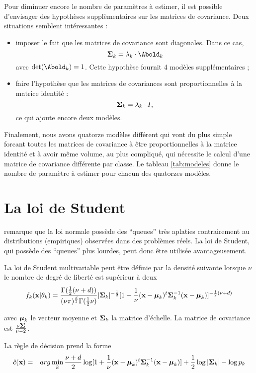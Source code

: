 Pour diminuer encore le nombre de param\`etres \`a estimer,
il est possible d'envisager des hypoth\`eses suppl\`ementaires
sur les matrices de covariance. Deux situations semblent
int\'eressantes :
\begin{itemize}
\item imposer le fait que les matrices de covariance sont diagonales. 
Dans ce cas, 
$$
\bSigma_k= \lambda_k \cdot \Abold_k
$$ 
avec  $\det(\Abold_k)=1$. Cette hypoth\`ese fournit 4 mod\`eles 
suppl\'ementaires ; 
\item faire l'hypoth\`ese que les matrices de covariances sont
proportionnelles \`a la matrice identit\'e :
$$
\mbox{\boldmath $\Sigma$}_k= \lambda_k \cdot I,
$$
ce qui ajoute encore deux mod\`eles.
\end{itemize}  


Finalement, nous avons quatorze mod\`eles diff\'erent qui vont
du plus simple forcant toutes les matrices de covariance \`a \^etre
proportionnelles \`a la matrice identit\'e et \`a avoir m\^eme volume,
au plus compliqu\'e, qui n\'ecessite le calcul d'une matrice de 
covariance diff\'erente par classe. Le tableau \ref{tab:modeles}
donne le nombre de param\`etre \`a estimer pour chacun des quatorzes
mod\`eles.



\section{La loi de Student}
 remarque que la loi normale poss\`ede des ``queues''
tr\`es aplaties contrairement au distributions (empiriques) observ\'ees
dans des probl\`emes r\'eels. La loi de Student, qui poss\`ede des ``queues''
plus lourdes, peut donc \^etre utilis\'ee avantageusement.

La loi de Student multivariable peut \^etre d\'efinie par la densit\'e suivante
lorsque $\nu$ le nombre de degr\'e de libert\'e est sup\'erieur \`a deux
\begin{equation}
f_k(\mbox{\bf x}| \theta_k)=\frac{\Gamma(\frac{1}{2}(\nu+d))}{(\nu\pi)^\frac{d}{2} \Gamma(\frac{1}{2}\nu)}|\mbox{\boldmath $\Sigma$}_k|^{-\frac{1}{2}}[1+\frac{1}{\nu}(\mbox{\bf x}-\mbox{\boldmath $\mu$}_k)^t\mbox{\boldmath $\Sigma$}_k^{-1}(\mbox{\bf x}-\mbox{\boldmath $\mu$}_k)]^{-\frac{1}{2}(\nu+d)} 
\end{equation}

avec $\mbox{\boldmath $\mu$}_k$ le vecteur moyenne et $\mbox{\boldmath $\Sigma$}_k$ la matrice 
d'\'echelle. La matrice de covariance est $\frac{\nu\mbox{\boldmath $\Sigma$}}{\nu-2}$.

La r\`egle de d\'ecision prend la forme
\begin{eqnarray*}
\hat{c}(\mbox{\bf x}) & = & arg \min_k \frac{\nu+d}{2}\log[1+\frac{1}{\nu}(\mbox{\bf x}-\mbox{\boldmath $\mu$}_k)^t\mbox{\boldmath $\Sigma$}_k^{-1}(\mbox{\bf x}-\mbox{\boldmath $\mu$}_k)]+\frac{1}{2}\log|\mbox{\boldmath $\Sigma$}_k|-\log p_k
\end{eqnarray*}

